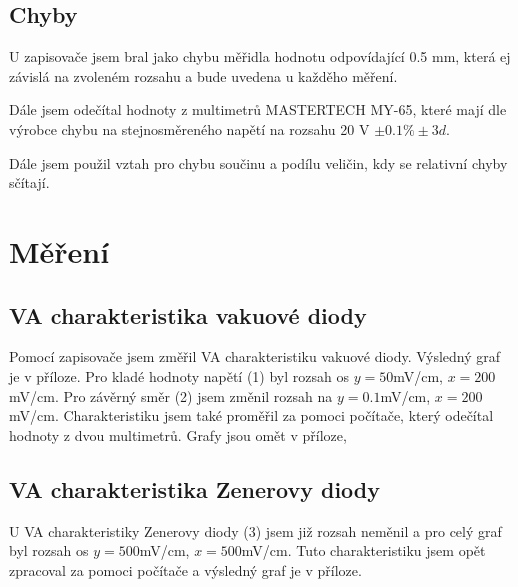 \documentclass[a4paper,12pt]{article}
\begin{document}
\subsection{Chyby}
U zapisovače jsem bral jako chybu měřidla hodnotu odpovídající 0.5 mm, která ej závislá na zvoleném rozsahu a bude uvedena u každěho měření.

Dále jsem odečítal hodnoty z multimetrů MASTERTECH MY-65, které mají dle výrobce chybu na stejnosměreného napětí na rozsahu 20 V $\pm0.1\% \pm 3d$.

Dále jsem použil vztah pro chybu součinu a podílu veličin, kdy se relativní chyby sčítají.

\section{Měření}
\subsection{VA charakteristika vakuové diody}
Pomocí zapisovače jsem změřil VA charakteristiku vakuové diody. Výsledný graf je v příloze. Pro kladé hodnoty napětí (1) byl rozsah os
$y=50$mV/cm, $x=200$mV/cm. Pro závěrný směr (2) jsem změnil rozsah na $y=0.1$mV/cm, $x=200$mV/cm. Charakteristiku jsem také proměřil za 
pomoci počítače, který odečítal hodnoty z dvou multimetrů. Grafy jsou omět v příloze,

\subsection{VA charakteristika Zenerovy diody}
U VA charakteristiky Zenerovy diody (3) jsem již rozsah neměnil a pro celý graf byl rozsah os $y=500$mV/cm, $x=500$mV/cm.
Tuto charakteristiku jsem opět zpracoval za pomoci počítače a výsledný graf je v příloze.
\end{document}
